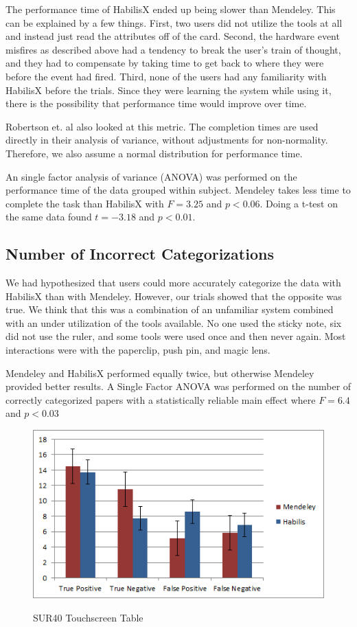 \documentclass{article}
\begin{document}
The performance time of HabilisX ended up being slower than Mendeley.  This can be explained by a few things.  First, two users did not utilize the tools at all and instead just read the attributes off of the card.  Second, the hardware event misfires as described above had a tendency to break the user's train of thought, and they had to compensate by taking time to get back to where they were before the event had fired.  Third, none of the users had any familiarity with HabilisX before the trials.  Since they were learning the system while using it, there is the possibility that performance time would improve over time. 


Robertson et. al  \cite{Robertson1998} also looked at this metric.  The completion times are used directly in their analysis of variance, without adjustments for non-normality.  Therefore, we also assume a normal distribution for performance time.


An single factor analysis of variance (ANOVA) was performed on the performance time of the data grouped within subject. Mendeley takes less time to complete the task than HabilisX with $F=3.25$ and $p < 0.06$.  Doing a t-test on the same data found $t=-3.18$ and $p<0.01$. 




\subsection*{Number of Incorrect Categorizations}

We had hypothesized that users could more accurately categorize the data with HabilisX than with Mendeley.  However, our trials showed that the opposite was true.  We think that this was a combination of an unfamiliar system combined with an under utilization of the tools available.  No one used the sticky note, six did not use the ruler, and some tools were used once and then never again.  Most interactions were with the paperclip, push pin, and magic lens.    

Mendeley and HabilisX performed equally twice, but otherwise Mendeley provided better results.  A Single Factor ANOVA was performed on the number of correctly categorized papers with a statistically reliable main effect where $F=6.4$ and $p<0.03$

\begin{figure}[ht!]
\centering
\scalebox{1}
{\includegraphics{BarChartSquare.png}}
\caption{SUR40 Touchscreen Table}
\label{Fig:barChart}
\end{figure}
\end{document}
